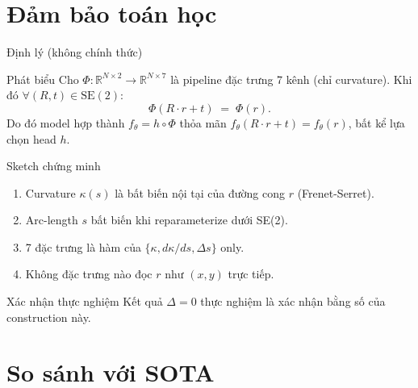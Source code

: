 \documentclass[aspectratio=169,10pt]{beamer}
\begin{document}
\section{Đảm bảo toán học}

\begin{frame}{Định lý (không chính thức)}
\begin{block}{Phát biểu}
\scriptsize
Cho $\Phi: \mathbb{R}^{N \times 2} \to \mathbb{R}^{N \times 7}$ là pipeline đặc trưng 7 kênh (chỉ curvature). Khi đó $\forall(R, t) \in \mathrm{SE}(2)$:
\[
  \Phi(R \cdot r + t) \;=\; \Phi(r).
\]
Do đó model hợp thành $f_\theta = h \circ \Phi$ thỏa mãn $f_\theta(R \cdot r + t) = f_\theta(r)$, bất kể lựa chọn head $h$.
\end{block}

\begin{block}{Sketch chứng minh}
\scriptsize
\begin{enumerate}
  \item Curvature $\kappa(s)$ là bất biến nội tại của đường cong $r$ (Frenet-Serret).
  \item Arc-length $s$ bất biến khi reparameterize dưới SE(2).
  \item 7 đặc trưng là hàm của $\{\kappa, d\kappa/ds, \Delta s\}$ only.
  \item Không đặc trưng nào đọc $r$ như $(x, y)$ trực tiếp.
\end{enumerate}
\end{block}

\begin{block}{Xác nhận thực nghiệm}
\scriptsize
Kết quả $\Delta = 0$ thực nghiệm là xác nhận bằng số của construction này.
\end{block}
\end{frame}

\section{So sánh với SOTA}
\end{document}
